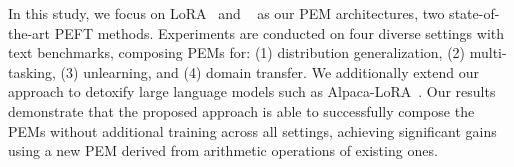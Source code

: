 In this study, we focus on LoRA~\citep{hu2021lora} and \ia~\citep{liu2022few} as our PEM architectures, two state-of-the-art PEFT methods. 
Experiments are conducted on four diverse settings with text benchmarks, composing PEMs for: 
(1) distribution generalization, (2) multi-tasking, (3) unlearning, and (4) domain transfer. We additionally extend our approach to detoxify large language models such as Alpaca-LoRA~\citep{alpacalora}.
Our results demonstrate that the proposed approach is able to successfully compose the PEMs without additional training across all settings, achieving significant gains using a new PEM derived from arithmetic operations of existing ones.







